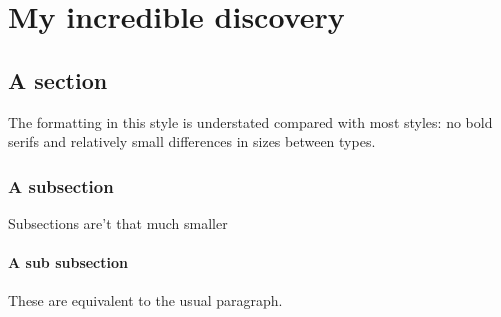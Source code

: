 \chapter{My incredible discovery}
\label{chap:incredible-discovery}

\section{A section}

The formatting in this style is understated compared with most styles:
no bold serifs and relatively small differences in sizes between types.

\subsection{A subsection}

Subsections are't that much smaller

\subsubsection{A sub subsection}

These are equivalent to the usual paragraph.

